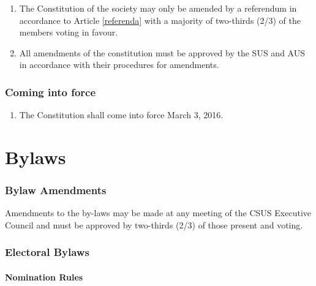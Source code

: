 \begin{enumerate}
\def\labelenumi{\arabic{enumi}.}
\item
  The Constitution of the society may only be amended by a referendum in
  accordance to Article \ref{referenda} with a majority of two-thirds (2/3) of the
  members voting in favour.
\item
  All amendments of the constitution must be approved by the SUS and AUS
  in accordance with their procedures for amendments.
\end{enumerate}

\section{Coming into force}\label{coming-into-force}

\begin{enumerate}
\def\labelenumi{\arabic{enumi}.}
\tightlist
\item
  The Constitution shall come into force March 3, 2016.
\end{enumerate}

\part{Bylaws}\label{bylaws}
\setcounter{section}{0}
\renewcommand\thesection{\Alph{section}}

\section{Bylaw Amendments}\label{bylaw-amendments}

Amendments to the by-laws may be made at any meeting of the CSUS
Executive Council and must be approved by two-thirds (2/3) of those
present and voting.

\section{Electoral Bylaws}\label{electoral-bylaws}

\subsection{Nomination Rules}\label{nomination-rules}

